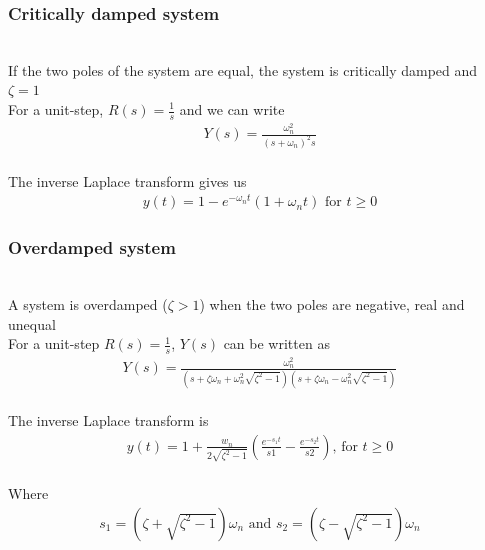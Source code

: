 \begin{frame}
\frametitle{Critically damped system}

\\ If the two poles of the system are equal, the system is critically damped and $\zeta=1$
\vspace{0.75cm}
\pause
\\ For a unit-step, $R(s)=\frac{1}{s}$ and we can write
\begin{align*}
Y(s) =\frac{\omega_n ^2}{(s+\omega_n)^2 s}
\end{align*}
\pause
\\ The inverse Laplace transform gives us
\begin{align*}
y(t) = 1 - e^{-\omega_n t}(1+\omega_n t) \text{ for } t\ge 0
\end{align*}         
\end{frame}

\begin{frame}
\frametitle{Overdamped system}
\\ A system is overdamped ($\zeta>1$) when the two poles are negative, real and unequal
\vspace{0.5cm}
\pause
\\ For a unit-step $R(s)=\frac{1}{s}$, $Y(s)$ can be written as
\\ \vspace{-0.25cm}
\begin{align*}
Y(s) = \frac{\omega_n ^2}{(s+\zeta\omega_n + \omega_n ^2\sqrt{\zeta^2 -1})(s+\zeta\omega_n - \omega_n ^2\sqrt{\zeta^2 -1})}
\end{align*} 
\pause
\\ The inverse Laplace transform is
\\ \vspace{-0.25cm}
\begin{align*}
y(t) = 1 +\frac{w_n}{2\sqrt{\zeta^2-1}}(\frac{e^{-s_1 t}}{s1} - \frac{e^{-s_2 t}}{s2})\text{, for } t\ge 0
\end{align*}
\pause
\\ Where
\\ \vspace{-0.25cm}
\begin{align*}
s_1 = (\zeta +\sqrt{\zeta^2 -1})\omega_n\text{ and } s_2 = (\zeta -\sqrt{\zeta^2 -1})\omega_n
\end{align*}
\end{frame}

